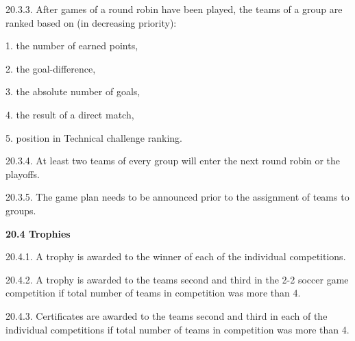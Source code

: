 \documentclass[a4paper]{article}
\begin{document}
20.3.3. After games of a round robin have been played, the teams of a group are ranked based on (in decreasing
priority):

1. the number of earned points, 

2. the goal-difference,

3. the absolute number of goals, 

4. the result of a direct match,

5. position in Technical challenge ranking.

20.3.4. At least two teams of every group will enter the next round robin or the playoffs.

20.3.5. The game plan needs to be announced prior to the assignment of teams to groups.

\textbf{20.4 Trophies}

20.4.1. A trophy is awarded to the winner of each of the individual competitions.

20.4.2. A trophy is awarded to the teams second and third in the 2-2 soccer game competition if total number of teams in
competition was more than 4.

20.4.3. Certificates are awarded to the teams second and third in each of the individual competitions if total number of
teams in competition was more than 4.
\end{document}
